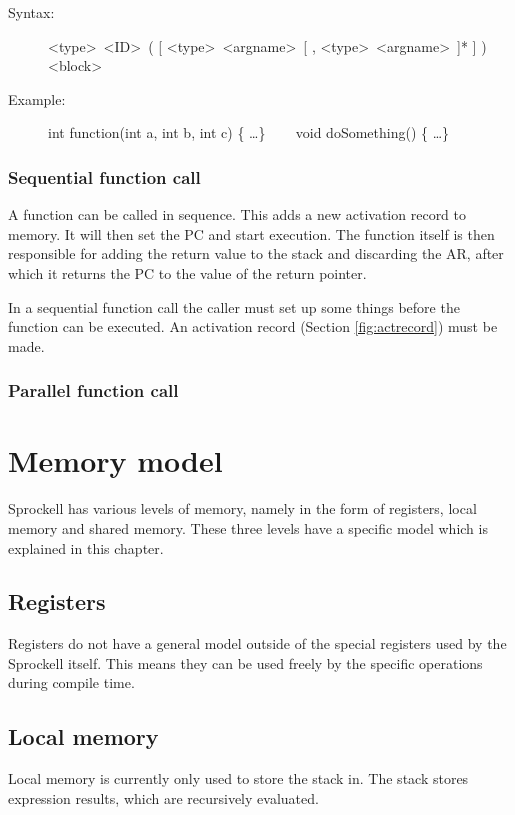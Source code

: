 \documentclass[10pt,a4paper]{report}
\begin{document}
\begin{description}
	\item[Syntax:] 
		\textless type\textgreater ~\textless ID\textgreater ~( [ \textless type\textgreater ~\textless argname\textgreater ~[ , \textless type\textgreater ~\textless argname\textgreater ~]* ] ) \textless block\textgreater
	\item[Example:] 
		int function(int a, int b, int c) \{ \ldots \} ~~~
		void doSomething() \{ \ldots \}
\end{description} 



\subsubsection{Sequential function call}
A function can be called in sequence. This adds a new activation record to memory. It will then set the PC and start execution. The function itself is then responsible for adding the return value to the stack and discarding the AR, after which it returns the PC to the value of the return pointer.


In a sequential function call the caller must set up some things before the function can be executed. An activation record (Section \ref{fig:actrecord}) must be made. 



\subsubsection{Parallel function call}






\section{Memory model}
Sprockell has various levels of memory, namely in the form of registers, local memory and shared memory. These three levels have a specific model which is explained in this chapter.

\subsection{Registers}
Registers do not have a general model outside of the special registers used by the Sprockell itself. This means they can be used freely by the specific operations during compile time.

\subsection{Local memory}
Local memory is currently only used to store the stack in. The stack stores expression results, which are recursively evaluated.
\end{document}
